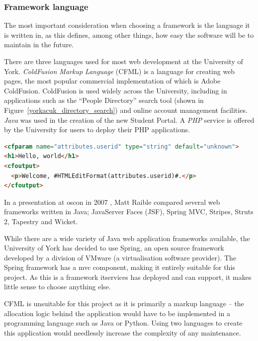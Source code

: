 \documentclass[]{scrartcl}
\begin{document}

\subsubsection{Framework language}


The most important consideration when choosing a framework is the language it
is written in, as this defines, among other things, how easy the software will
be to maintain in the future.


There are three languages used for most web development at the University of
York. \emph{ColdFusion Markup Language} (CFML) is a language for creating web pages,
the most popular commercial implementation of which is Adobe ColdFusion.
ColdFusion is used widely across the University, including in applications
such as the ``People Directory'' search tool (shown in
Figure~\ref{yorkacuk_directory_search}) and online account management
facilities. \emph{Java} was used in the creation of the new Student Portal. A
\emph{PHP} service is offered by the University for users to deploy their PHP
applications.

\begin{lstlisting}[language=HTML]
<cfparam name="attributes.userid" type="string" default="unknown">
<h1>Hello, world</h1>
<cfoutput>
  <p>Welcome, #HTMLEditFormat(attributes.userid)#.</p>
</cfoutput>
\end{lstlisting}

In a presentation at \gls{oscon} in 2007 \cite{raible2007javawebframeworks},
Matt Raible compared several web frameworks written in Java; JavaServer Faces
(JSF), Spring MVC, Stripes, Struts 2, Tapestry and Wicket.

While there are a wide variety of Java web application frameworks available,
the University of York has decided to use Spring, an open source framework
developed by a division of VMware (a virtualisation software provider). The
Spring framework has a \gls{mvc} component, making it entirely suitable for
this project. As this is a framework \gls{itservices} has deployed and can
support, it makes little sense to choose anything else.

CFML is unsuitable for this project as it is primarily a markup language -- the
allocation logic behind the application would have to be implemented in a
programming language such as Java or Python. Using two languages to create
this application would needlessly increase the complexity of any maintenance.
\end{document}
